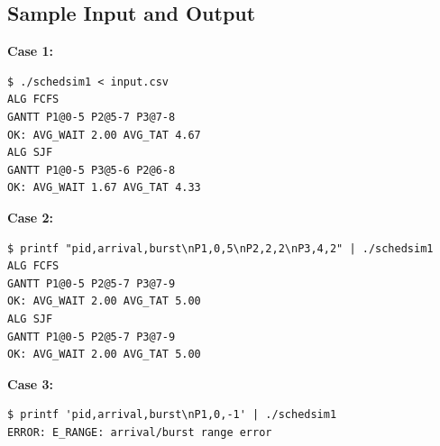 \subsection{Sample Input and Output}

\textbf{Case 1:}
\begin{verbatim}
$ ./schedsim1 < input.csv
ALG FCFS
GANTT P1@0-5 P2@5-7 P3@7-8
OK: AVG_WAIT 2.00 AVG_TAT 4.67
ALG SJF
GANTT P1@0-5 P3@5-6 P2@6-8
OK: AVG_WAIT 1.67 AVG_TAT 4.33
\end{verbatim}

\textbf{Case 2:}
\begin{verbatim}
$ printf "pid,arrival,burst\nP1,0,5\nP2,2,2\nP3,4,2" | ./schedsim1
ALG FCFS
GANTT P1@0-5 P2@5-7 P3@7-9
OK: AVG_WAIT 2.00 AVG_TAT 5.00
ALG SJF
GANTT P1@0-5 P2@5-7 P3@7-9
OK: AVG_WAIT 2.00 AVG_TAT 5.00
\end{verbatim}

\textbf{Case 3:}
\begin{verbatim}
$ printf 'pid,arrival,burst\nP1,0,-1' | ./schedsim1
ERROR: E_RANGE: arrival/burst range error
\end{verbatim}